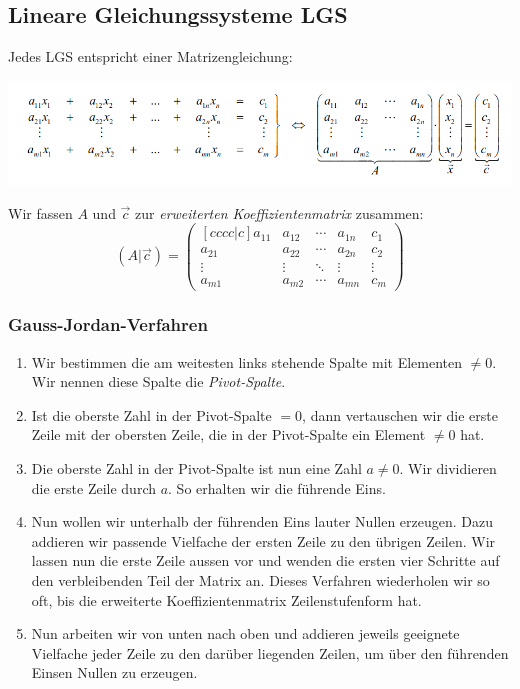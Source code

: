 \subsection{Lineare Gleichungssysteme LGS}
Jedes LGS entspricht einer Matrizengleichung:
\begin{center}
  \includegraphics[width=0.9\linewidth]{images/lgs.png}
\end{center}
Wir fassen $A$ und $\vec{c}$ zur \textit{erweiterten Koeffizientenmatrix} zusammen:
\begin{equation*}
  (A|\vec{c})=
  \begin{pmatrix}[cccc|c]
    a_{11} & a_{12} & \cdots & a_{1n} & c_1 \\
    a_{21} & a_{22} & \cdots & a_{2n} & c_2 \\
    \vdots & \vdots & \ddots & \vdots & \vdots \\
    a_{m1} & a_{m2} & \cdots & a_{mn} & c_m
  \end{pmatrix} 
\end{equation*}

\subsubsection{Gauss-Jordan-Verfahren}%
\label{ssub:Gauss-Jordan-Verfahren}
\begin{enumerate}
  \item Wir bestimmen die am weitesten links stehende Spalte mit Elementen $\neq 0$. Wir nennen diese Spalte die \textit{Pivot-Spalte}.
  \item Ist die oberste Zahl in der Pivot-Spalte $=0$, dann vertauschen wir die erste Zeile mit der obersten Zeile, die in der Pivot-Spalte ein Element $\neq 0$ hat.
  \item Die oberste Zahl in der Pivot-Spalte ist nun eine Zahl $a \neq 0$. Wir dividieren die erste Zeile durch $a$. So erhalten wir die führende Eins.
  \item Nun wollen wir unterhalb der führenden Eins lauter Nullen erzeugen. Dazu addieren wir passende Vielfache der ersten Zeile zu den übrigen Zeilen.
    Wir lassen nun die erste Zeile aussen vor und wenden die ersten vier Schritte auf den verbleibenden Teil der Matrix an. Dieses Verfahren wiederholen wir so oft, bis die erweiterte Koeffizientenmatrix Zeilenstufenform hat.
  \item Nun arbeiten wir von unten nach oben und addieren jeweils geeignete Vielfache jeder Zeile zu den darüber liegenden Zeilen, um über den führenden Einsen Nullen zu erzeugen.
\end{enumerate}

